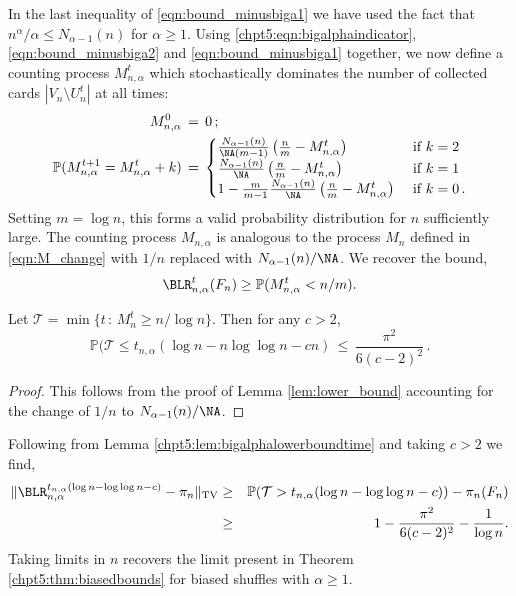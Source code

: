 \documentclass[11pt]{report}
\begin{document}
In the last inequality of \eqref{eqn:bound_minusbiga1} we have used the fact that $n^{\alpha}/\alpha \leq N_{\alpha-1}(n)$ for $\alpha\geq1$.
Using \eqref{chpt5:eqn:bigalphaindicator}, \eqref{eqn:bound_minusbiga2} and 
\eqref{eqn:bound_minusbiga1} together, we now define a counting process $M_{n,\alpha}^t$ 
which stochastically dominates the number of collected cards $|V_n\setminus 
U_n^{t}|$ at all times: 
\begin{align}
M_{n,\alpha}^0 \,&=\, 0 \,; \nonumber \\
\mathbb{P}({M}^{t+1}_{n, \alpha} = {M}^{t}_{n,\alpha}+k) \,&=\, 
\begin{cases} 
\frac{N_{\alpha-1}(n) 
}{\NA(m-1)}\left(\frac{n}{m}-{M}^{t}_{n,\alpha}\right) 
& 
\text{ 
	if } k=2\\
\frac{N_{\alpha-1}(n) }{\NA}\left(\frac{n}{m}-{M}^{t}_{n,\alpha}\right) 
& 
\text{ if } 
k 
=1\\
1-\frac{m}{m-1}\frac{N_{\alpha-1}(n) 
}{\NA}\left(\frac{n}{m}-{M}^{t}_{n,\alpha}\right)  & 
\text{ if } k =0\,. \label{eqn:biasedbigM_change}
\end{cases}
\end{align}
Setting $m= \log n$, this forms a valid 
probability distribution for $n$ sufficiently large.
The counting process $M_{n,\alpha}$ is analogous to the process 
$M_{n}$ defined in \eqref{eqn:M_change} with $1/n$ replaced with $N_{\alpha-1}(n) /\NA$. We recover the bound,
\[\BLR_{n,\alpha}^{t}(F_{n}) \geq \mathbb{P}(M_{n,\alpha}^{t} < n/m).\]

\begin{lemma}
	\label{chpt5:lem:bigalphalowerboundtime}
	Let $\mathcal{T} = \min\{t\,:\, M_n^t \ge n/\log n\}$. Then for any 
	$c>2$,
	\[\mathbb{P}(\mathcal{T}\leq t_{n,\alpha}(\log n - n \log 
	\log n 	-cn)\, \leq \, \frac{\pi^{2}}{6(c-2)^2} \,. \] 
\end{lemma}
\begin{proof}
	This follows from the proof of Lemma \ref{lem:lower_bound} accounting for the change of $1/n$ to $N_{\alpha-1}(n)/\NA$.
\end{proof}
Following from Lemma \ref{chpt5:lem:bigalphalowerboundtime} and taking $c>2$ we find,
\begin{eqnarray*}
	\lVert \BLR_{n,\alpha}^{t_{n,\alpha}(\log n - \log \log n -c)} -\pi_{n} \rVert_{\tiny \textnormal{TV}} &\geq &\mathbb{P}(\mathcal{T} > t_{n,\alpha}(\log n - \log \log n -c)) - \pi_{n} (F_{n})\\
	& \geq &1 - \frac{\pi^{2}}{6(c-2)^{2}} - \frac{1}{\log n}.
\end{eqnarray*}
Taking limits in $n$ recovers the limit present in Theorem \ref{chpt5:thm:biasedbounds} for biased shuffles with $\alpha \geq 1$.
\end{document}
